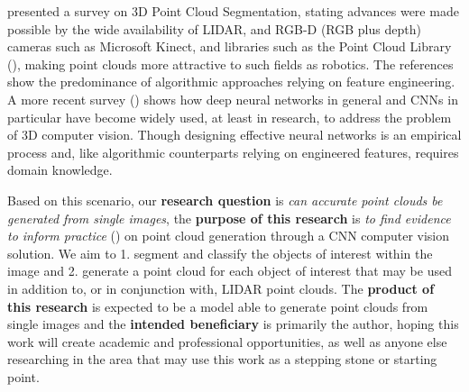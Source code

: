 \cite{NguyenSurvey2013} presented a survey on 3D Point Cloud Segmentation, stating advances were made possible by the wide availability of LIDAR, and RGB-D (RGB plus depth) cameras such as Microsoft Kinect, and libraries such as the Point Cloud Library (\cite{pointcloud2011}), making point clouds more attractive to such fields as robotics. The references show the predominance of algorithmic approaches relying on feature engineering. A more recent survey (\cite{guo2019deep}) shows how deep neural networks in general and CNNs in particular have become widely used, at least in research, to address the problem of 3D computer vision. Though designing effective neural networks is an empirical process and, like algorithmic counterparts relying on engineered features, requires domain knowledge.

Based on this scenario, our \textbf{research question} is \textit{can accurate point clouds be generated from single images}, the \textbf{purpose of this research} is \textit{to find evidence to inform practice} (\cite{Oates:2006}) on point cloud generation through a CNN computer vision solution. We aim to 1. segment and classify the objects of interest within the image and 2. generate a point cloud for each object of interest that may be used in addition to, or in conjunction with, LIDAR point clouds. The \textbf{product of this research} is expected to be a model able to generate point clouds from single images and the \textbf{intended beneficiary} is primarily the author, hoping this work will create academic and professional opportunities, as well as anyone else researching in the area that may use this work as a stepping stone or starting point.


